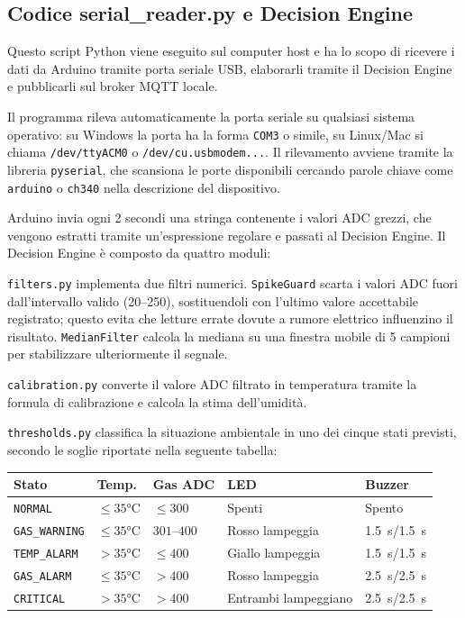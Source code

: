 \documentclass{article}
\begin{document}
\subsection{Codice serial\_reader.py e Decision Engine}

Questo script Python viene eseguito sul computer host e ha lo scopo di ricevere
i dati da Arduino tramite porta seriale USB, elaborarli tramite il Decision Engine
e pubblicarli sul broker MQTT locale.

Il programma rileva automaticamente la porta seriale su qualsiasi sistema
operativo: su Windows la porta ha la forma \texttt{COM3} o simile, su
Linux/Mac si chiama \texttt{/dev/ttyACM0} o \texttt{/dev/cu.usbmodem...}.
Il rilevamento avviene tramite la libreria \texttt{pyserial}, che scansiona le
porte disponibili cercando parole chiave come \texttt{arduino} o \texttt{ch340}
nella descrizione del dispositivo.

Arduino invia ogni 2 secondi una stringa contenente i valori ADC grezzi, che
vengono estratti tramite un'espressione regolare e passati al Decision Engine.
Il Decision Engine è composto da quattro moduli:

\texttt{filters.py} implementa due filtri numerici. \texttt{SpikeGuard} scarta
i valori ADC fuori dall'intervallo valido (20--250), sostituendoli con l'ultimo
valore accettabile registrato; questo evita che letture errate dovute a rumore
elettrico influenzino il risultato. \texttt{MedianFilter} calcola la mediana
su una finestra mobile di 5 campioni per stabilizzare ulteriormente il segnale.

\texttt{calibration.py} converte il valore ADC filtrato in temperatura tramite
la formula di calibrazione e calcola la stima dell'umidità.

\texttt{thresholds.py} classifica la situazione ambientale in uno dei cinque
stati previsti, secondo le soglie riportate nella seguente tabella:

\begin{center}
\begin{tabular}{lllll}
\toprule
\textbf{Stato} & \textbf{Temp.} & \textbf{Gas ADC} & \textbf{LED} & \textbf{Buzzer} \\
\midrule
\texttt{NORMAL}      & $\leq 35$°C & $\leq 300$   & Spenti              & Spento      \\
\texttt{GAS\_WARNING}& $\leq 35$°C & $301$--$400$ & Rosso lampeggia     & 1.5~s/1.5~s \\
\texttt{TEMP\_ALARM} & $> 35$°C    & $\leq 400$   & Giallo lampeggia    & 1.5~s/1.5~s \\
\texttt{GAS\_ALARM}  & $\leq 35$°C & $> 400$      & Rosso lampeggia     & 2.5~s/2.5~s \\
\texttt{CRITICAL}    & $> 35$°C    & $> 400$      & Entrambi lampeggiano& 2.5~s/2.5~s \\
\bottomrule
\end{tabular}
\end{center}
\end{document}
